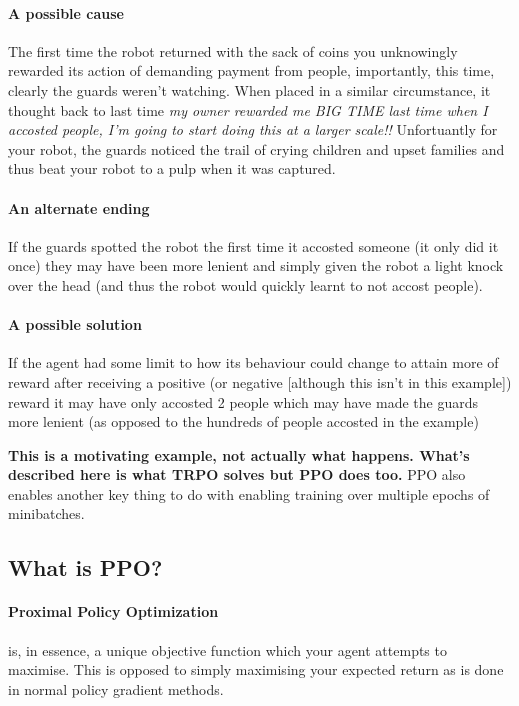 \documentclass{article}
\begin{document}
\begin{enumerate}
\paragraph{A possible cause} The first time the robot returned with the sack of coins you unknowingly rewarded its action of demanding payment from people, importantly, this time, clearly the guards weren't watching. When placed in a similar circumstance, it thought back to last time \emph{my owner rewarded me BIG TIME last time when I accosted people, I'm going to start doing this at a larger scale!!} Unfortuantly for your robot, the guards noticed the trail of crying children and upset families and thus beat your robot to a pulp when it was captured.
\paragraph{An alternate ending} If the guards spotted the robot the first time it accosted someone (it only did it once) they may have been more lenient and simply given the robot a light knock over the head (and thus the robot would quickly learnt to not accost people).
\paragraph{A possible solution} If the agent had some limit to how its behaviour could change to attain more of reward after receiving a positive (or negative [although this isn't in this example]) reward it may have only accosted 2 people which may have made the guards more lenient (as opposed to the hundreds of people accosted in the example)

\textbf{This is a motivating example, not actually what happens. What's described here is what TRPO solves but PPO does too.} PPO also enables another key thing to do with enabling training over multiple epochs of minibatches. 

\end{enumerate}

\subsection{What is PPO?}

\paragraph{Proximal Policy Optimization} is, in essence, a unique objective function which your agent attempts to maximise. This is opposed to simply maximising your expected return as is done in normal policy gradient methods.
\end{document}
